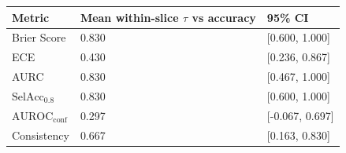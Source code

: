 \begin{tabular}{lll}
\toprule
Metric & Mean within-slice $\tau$ vs accuracy & 95\% CI \\
\midrule
Brier Score & 0.830 & [0.600, 1.000] \\
ECE & 0.430 & [0.236, 0.867] \\
AURC & 0.830 & [0.467, 1.000] \\
$\text{SelAcc}_{0.8}$ & 0.830 & [0.600, 1.000] \\
$\text{AUROC}_{\text{conf}}$ & 0.297 & [-0.067, 0.697] \\
Consistency & 0.667 & [0.163, 0.830] \\
\bottomrule
\end{tabular}
